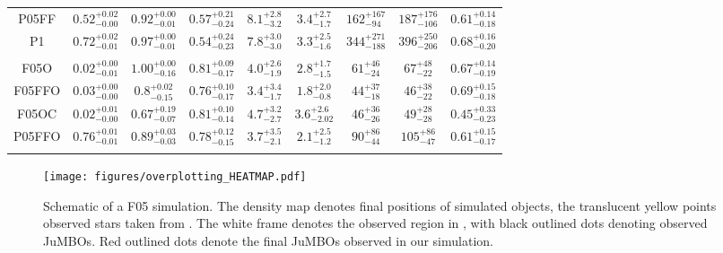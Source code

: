 \documentclass[aa]{aa}
\begin{document}
\begin{table*}
\begin{tabular}{c c c c c c c c c}
           P05FF   & $0.52^{+0.02}_{-0.00}$ & $0.92^{+0.00}_{-0.01}$ & $0.57^{+0.21}_{-0.24}$ & $8.1^{+2.8}_{-3.2}$ & $3.4^{+2.7}_{-1.7}$ & $162^{+167}_{-94}$ & $187^{+176}_{-106}$ & $0.61^{+0.14}_{-0.18}$ \vspace{0.25em}\\
           P1      & $0.72^{+0.02}_{-0.01}$ & $0.97^{+0.00}_{-0.01}$ & $0.54^{+0.24}_{-0.23}$ & $7.8^{+3.0}_{-3.0}$ & $3.3^{+2.5}_{-1.6}$ & $344^{+271}_{-188}$ & $396^{+250}_{-206}$ & $0.68^{+0.16}_{-0.20}$ \vspace{0.25em}\\
           \hline \vspace{-0.75em}\\
           F05O    & $0.02^{+0.00}_{-0.01}$ & $1.00^{+0.00}_{-0.16}$ & $0.81^{+0.09}_{-0.17}$ & $4.0^{+2.6}_{-1.9}$ & $2.8^{+1.7}_{-1.5}$ & $61^{+46}_{-24}$ & $67^{+48}_{-22}$ & $0.67^{+0.14}_{-0.19}$ \vspace{0.25em}\\
           F05FFO  & $0.03^{+0.00}_{-0.00}$ & $0.8^{+0.02}_{-0.15}$ & $0.76^{+0.10}_{-0.17}$ & $3.4^{+3.4}_{-1.7}$ & $1.8^{+2.0}_{-0.8}$ & $44^{+37}_{-18}$ & $46^{+38}_{-22}$ & $0.69^{+0.15}_{-0.18}$ \vspace{0.25em}\\
           F05OC   & $0.02^{+0.01}_{-0.00}$ & $0.67^{+0.19}_{-0.07}$ & $0.81^{+0.10}_{-0.14}$ & $4.7^{+3.2}_{-2.7}$ & $3.6^{+2.6}_{-2.02}$ & $46^{+36}_{-26}$ & $49^{+28}_{-28}$ & $0.45^{+0.33}_{-0.23}$ \vspace{0.25em}\\
           P05FFO  & $0.76^{+0.01}_{-0.01}$ & $0.89^{+0.03}_{-0.03}$ & $0.78^{+0.12}_{-0.15}$ & $3.7^{+3.5}_{-2.1}$ & $2.1^{+2.5}_{-1.2}$ & $90^{+86}_{-44}$ & $105^{+86}_{-47}$ & $0.61^{+0.15}_{-0.17}$ \vspace{0.25em}\\
           \hline
         \hline                                   %
         \label{Tab:Final_ISF_FFC_Results}
        \end{tabular}
     \end{table*}
    
   \begin{figure}
    \centering
        \texttt{[image: figures/overplotting\_HEATMAP.pdf]}
        \caption{Schematic of a F05 simulation. The density map denotes final positions of simulated objects, the translucent yellow points observed stars taken from \citet{2016A&A...595A...1G, 2023A&A...674A...1G}. The white frame denotes the observed region in \citet{2023arXiv231001231P}, with black outlined dots denoting observed JuMBOs. Red outlined dots denote the final JuMBOs observed in our simulation.}
         \label{Fig:Overplot}
   \end{figure}
\end{document}
